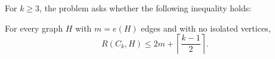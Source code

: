 For $k\ge 3$, the problem asks whether the following inequality holds:

For every graph $H$ with $m=e(H)$ edges and with no isolated vertices,
\[
R(C_k,H) \le 2m+\left\lceil\frac{k-1}{2}\right\rceil.
\]
